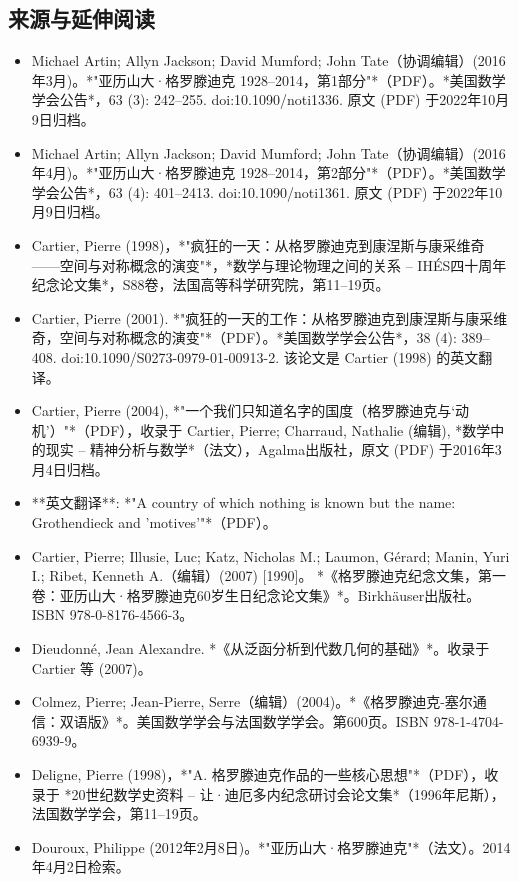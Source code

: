 \subsection{来源与延伸阅读}
\begin{itemize}
\item Michael Artin; Allyn Jackson; David Mumford; John Tate（协调编辑）(2016年3月)。*"亚历山大·格罗滕迪克 1928–2014，第1部分"*（PDF）。*美国数学学会公告*，63 (3): 242–255. doi:10.1090/noti1336. 原文 (PDF) 于2022年10月9日归档。  
\item Michael Artin; Allyn Jackson; David Mumford; John Tate（协调编辑）(2016年4月)。*"亚历山大·格罗滕迪克 1928–2014，第2部分"*（PDF）。*美国数学学会公告*，63 (4): 401–2413. doi:10.1090/noti1361. 原文 (PDF) 于2022年10月9日归档。  
\item Cartier, Pierre (1998)，*"疯狂的一天：从格罗滕迪克到康涅斯与康采维奇——空间与对称概念的演变"*，*数学与理论物理之间的关系 – IHÉS四十周年纪念论文集*，S88卷，法国高等科学研究院，第11–19页。  
\item Cartier, Pierre (2001). *"疯狂的一天的工作：从格罗滕迪克到康涅斯与康采维奇，空间与对称概念的演变"*（PDF）。*美国数学学会公告*，38 (4): 389–408. doi:10.1090/S0273-0979-01-00913-2. 该论文是 Cartier (1998) 的英文翻译。  
\item Cartier, Pierre (2004), *"一个我们只知道名字的国度（格罗滕迪克与‘动机’）"*（PDF），收录于 Cartier, Pierre; Charraud, Nathalie (编辑), *数学中的现实 – 精神分析与数学*（法文），Agalma出版社，原文 (PDF) 于2016年3月4日归档。  
\item **英文翻译**: *"A country of which nothing is known but the name: Grothendieck and 'motives'"*（PDF）。 
\item Cartier, Pierre; Illusie, Luc; Katz, Nicholas M.; Laumon, Gérard; Manin, Yuri I.; Ribet, Kenneth A.（编辑）(2007) [1990]。 *《格罗滕迪克纪念文集，第一卷：亚历山大·格罗滕迪克60岁生日纪念论文集》*。Birkhäuser出版社。ISBN 978-0-8176-4566-3。
\item Dieudonné, Jean Alexandre. *《从泛函分析到代数几何的基础》*。收录于 Cartier 等 (2007)。
\item Colmez, Pierre; Jean-Pierre, Serre（编辑）(2004)。*《格罗滕迪克-塞尔通信：双语版》*。美国数学学会与法国数学学会。第600页。ISBN 978-1-4704-6939-9。  
\item Deligne, Pierre (1998)，*"A. 格罗滕迪克作品的一些核心思想"*（PDF），收录于 *20世纪数学史资料 – 让·迪厄多内纪念研讨会论文集*（1996年尼斯），法国数学学会，第11–19页。  
\item Douroux, Philippe (2012年2月8日)。*"亚历山大·格罗滕迪克"*（法文）。2014年4月2日检索。  

\end{itemize}
